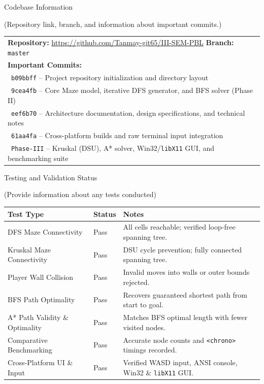 \documentclass[12pt,a4paper]{article}
\renewcommand{\arraystretch}{1}
\newcommand{\secthead}[2]{%
  {\fontsize{18}{21.9}\selectfont\color{geheading}#1\par}\vspace{1.6pt}%
  {\fontsize{10.5}{14.5}\selectfont\color{gehint}#2\par}%
  \vspace{\secgap}}
\newlength{\secgap}\setlength{\secgap}{5.7pt}
\newenvironment{answerbox}{%
  \noindent\begin{tabular}{|p{\dimexpr\textwidth-2\tabcolsep-2\arrayrulewidth\relax}|}\hline
  \fontsize{10.8}{13.3}\selectfont\setlength{\parskip}{3.5pt}\rule{0pt}{18pt}\ignorespaces}{%
  \rule[-11pt]{0pt}{0pt}\\\hline\end{tabular}\par}
\begin{document}
\vspace*{-0.15cm}

\secthead{Codebase Information }{(Repository link, branch, and information about important commits.)}

\begin{answerbox}
\textbf{Repository:} \url{https://github.com/Tanmay-git65/III-SEM-PBL} \hfill \textbf{Branch:} \texttt{master}\\[2.5pt]
\textbf{Important Commits:}\\[1pt]
\textbullet\ \texttt{b09bbff} -- Project repository initialization and directory layout\\
\textbullet\ \texttt{9cea4fb} -- Core Maze model, iterative DFS generator, and BFS solver (Phase II)\\
\textbullet\ \texttt{eef6b70} -- Architecture documentation, design specifications, and technical notes\\
\textbullet\ \texttt{61aa4fa} -- Cross-platform builds and raw terminal input integration\\
\textbullet\ \texttt{Phase-III} -- Kruskal (DSU), A* solver, Win32/\texttt{libX11} GUI, and benchmarking suite
\end{answerbox}

\vspace{10pt}

\secthead{Testing and Validation Status }{(Provide information about any tests conducted)}

{\fontsize{10.2}{12.2}\selectfont
\renewcommand{\arraystretch}{1.04}
\begin{tabularx}{\textwidth}{
|>{\raggedright\arraybackslash}p{}
|>{\raggedright\arraybackslash}p{}
|>{\raggedright\arraybackslash}X|
}
\hline
\textbf{Test Type} & \textbf{Status} & \textbf{Notes} \\
\hline
DFS Maze Connectivity & Pass & All cells reachable; verified loop-free spanning tree. \\
\hline
Kruskal Maze Connectivity & Pass & DSU cycle prevention; fully connected spanning tree. \\
\hline
Player Wall Collision & Pass & Invalid moves into walls or outer bounds rejected. \\
\hline
BFS Path Optimality & Pass & Recovers guaranteed shortest path from start to goal. \\
\hline
A* Path Validity \& Optimality & Pass & Matches BFS optimal length with fewer visited nodes. \\
\hline
Comparative Benchmarking & Pass & Accurate node counts and \texttt{<chrono>} timings recorded. \\
\hline
Cross-Platform UI \& Input & Pass & Verified WASD input, ANSI console, Win32 \& \texttt{libX11} GUI. \\
\hline
\end{tabularx}
\renewcommand{\arraystretch}{1}
}
\end{document}
